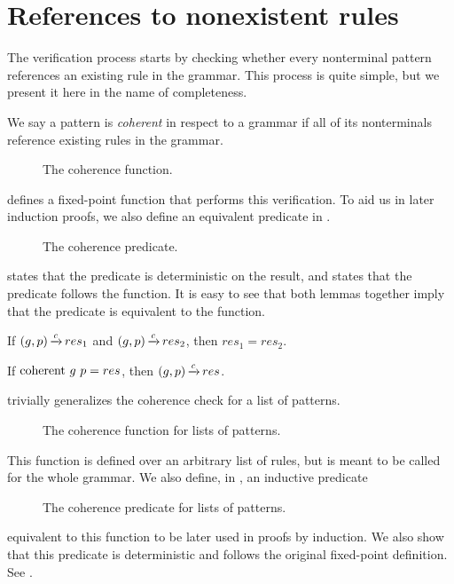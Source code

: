 \section{References to nonexistent rules}
\label{section:coherent}

The verification process
starts by checking whether
every nonterminal pattern references
an existing rule in the grammar.
This process is quite simple,
but we present it here in the name of completeness.

We say a pattern is
\emph{coherent} in respect to a grammar
if all of its nonterminals reference existing rules in the grammar.
\begin{figure}
    \centering
    
    \caption{The coherence function.}
    \label{fig:coherentfunc}
\end{figure}
defines a fixed-point function
that performs this verification.
To aid us in later induction proofs,
we also define an equivalent predicate in .
\begin{figure}
    
    \caption{The coherence predicate.}
    \label{fig:coherent}
\end{figure}
 states
that the predicate is deterministic on the result,
and  states that
the predicate follows the function.
It is easy to see that
both lemmas together imply that the
predicate is equivalent to the function.


\begin{lemma}
    \label{lemma:coherent-deterministic}
    If $(g,p) \operatorname{\xrightarrow{\mathit{c}}} res_1$ and $(g,p) \operatorname{\xrightarrow{\mathit{c}}} res_2$,
    then $res_1 = res_2$.
\end{lemma}

\begin{lemma}
    \label{lemma:coherent-follows}
    If $\text{coherent}{}\ g\ p = res$, then $(g,p) \operatorname{\xrightarrow{\mathit{c}}} res$.
\end{lemma}

 trivially generalizes the coherence check for a list of patterns.
\begin{figure}
    \centering
    
    \caption{The coherence function for lists of patterns.}
    \label{fig:lcoherent-function}
\end{figure}
This function is defined over an arbitrary list of rules,
but is meant to be called for the whole grammar.
We also define, in , an inductive predicate
\begin{figure}
    \centering
    
    \caption{The coherence predicate for lists of patterns.}
    \label{fig:lcoherent}
\end{figure}
equivalent to this function to be
later used in proofs by induction.
We also show that this predicate
is deterministic and follows
the original fixed-point definition.
See .

